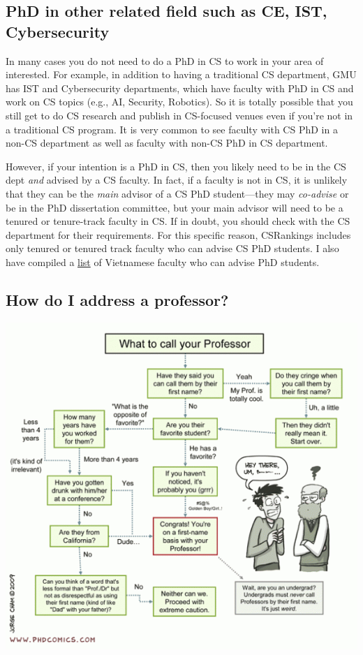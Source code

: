 \documentclass[11pt]{article}
\begin{document}
\subsection{PhD in other related field such as CE, IST, Cybersecurity}

In many cases you do not need to do a PhD in CS to work in your area of interested. For example, in addition to having a traditional CS department, GMU has IST and Cybersecurity departments, which have faculty  with PhD in CS and work on CS topics (e.g., AI, Security, Robotics).  So it is totally possible that you still get to do CS research and publish in CS-focused venues even if you're not in a traditional CS program.  It is very common to see faculty with CS PhD in a non-CS department as well as faculty with non-CS PhD in CS department.  

However, if your intention is a PhD in CS, then you likely need to be in the CS dept \emph{and} advised by a CS faculty. In fact, if a faculty is not in CS, it is unlikely that they can be the \emph{main} advisor of a CS PhD student---they may \emph{co-advise} or be in the PhD dissertation committee, but your main advisor will need to be a tenured or tenure-track faculty in CS. If in doubt, you should check with the CS department for their requirements.  For this specific reason,  CSRankings includes only tenured or tenured track faculty who can advise CS PhD students. I also have compiled a \href{https://github.com/dynaroars/dynaroars.github.io/wiki/Viet-CS-Profs-US}{list} of Vietnamese faculty who can advise PhD students. 

\subsection{How do I address a professor?}


      \begin{center}
        \includegraphics[scale=0.5]{c5.png}
      \end{center}
\end{document}
